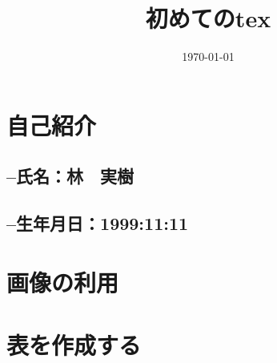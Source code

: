 \documentclass{jsarticle}
\date{\today}
\title{初めてのtex}
\begin{document}
\maketitle
\section {自己紹介}
\subsection {--氏名：林　実樹}

\subsection {--生年月日：1999:11:11}
\section {画像の利用}
\section {表を作成する}
\end{document}
